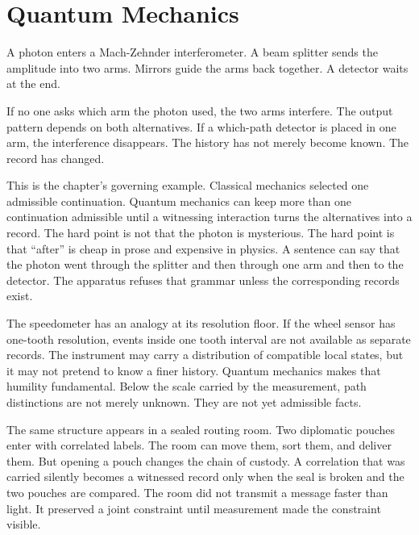 \chapter{Quantum Mechanics}
\label{chap:quantum-mechanics}


\begin{chapteressay}

A photon enters a Mach-Zehnder interferometer. A beam splitter sends the
amplitude into two arms. Mirrors guide the arms back together. A detector waits
at the end.

If no one asks which arm the photon used, the two arms interfere. The output
pattern depends on both alternatives. If a which-path detector is placed in one
arm, the interference disappears. The history has not merely become known. The
record has changed.

This is the chapter's governing example. Classical mechanics selected one
admissible continuation. Quantum mechanics can keep more than one continuation
admissible until a witnessing interaction turns the alternatives into a record.
The hard point is not that the photon is mysterious. The hard point is that
``after'' is cheap in prose and expensive in physics. A sentence can say that
the photon went through the splitter and then through one arm and then to the
detector. The apparatus refuses that grammar unless the corresponding records
exist.

The speedometer has an analogy at its resolution floor. If the wheel sensor has
one-tooth resolution, events inside one tooth interval are not available as
separate records. The instrument may carry a distribution of compatible local
states, but it may not pretend to know a finer history. Quantum mechanics makes
that humility fundamental. Below the scale carried by the measurement, path
distinctions are not merely unknown. They are not yet admissible facts.

The same structure appears in a sealed routing room. Two diplomatic pouches
enter with correlated labels. The room can move them, sort them, and deliver
them. But opening a pouch changes the chain of custody. A correlation that was
carried silently becomes a witnessed record only when the seal is broken and
the two pouches are compared. The room did not transmit a message faster than
light. It preserved a joint constraint until measurement made the constraint
visible.


\end{chapteressay}
